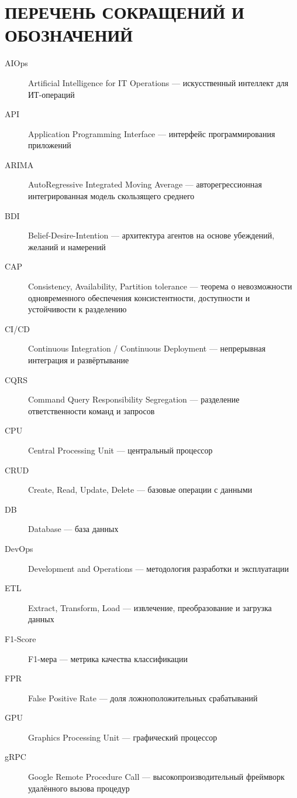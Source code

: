 \chapter*{ПЕРЕЧЕНЬ СОКРАЩЕНИЙ И ОБОЗНАЧЕНИЙ}

\vspace{1cm}

\begin{sloppypar}
\begin{description}
    \item[AIOps] Artificial Intelligence for IT Operations — искусственный интеллект для ИТ-операций
    \item[API] Application Programming Interface — интерфейс программирования приложений
    \item[ARIMA] AutoRegressive Integrated Moving Average — авторегрессионная интегрированная модель скользящего среднего
    \item[BDI] Belief-Desire-Intention — архитектура агентов на основе убеждений, желаний и намерений
    \item[CAP] Consistency, Availability, Partition tolerance — теорема о невозможности одновременного обеспечения консистентности, доступности и устойчивости к разделению
    \item[CI/CD] Continuous Integration / Continuous Deployment — непрерывная интеграция и развёртывание
    \item[CQRS] Command Query Responsibility Segregation — разделение ответственности команд и запросов
    \item[CPU] Central Processing Unit — центральный процессор
    \item[CRUD] Create, Read, Update, Delete — базовые операции с данными
    \item[DB] Database — база данных
    \item[DevOps] Development and Operations — методология разработки и эксплуатации
    \item[ETL] Extract, Transform, Load — извлечение, преобразование и загрузка данных
    \item[F1-Score] F1-мера — метрика качества классификации
    \item[FPR] False Positive Rate — доля ложноположительных срабатываний
    \item[GPU] Graphics Processing Unit — графический процессор
    \item[gRPC] Google Remote Procedure Call — высокопроизводительный фреймворк удалённого вызова процедур

\end{description}
\end{sloppypar}
